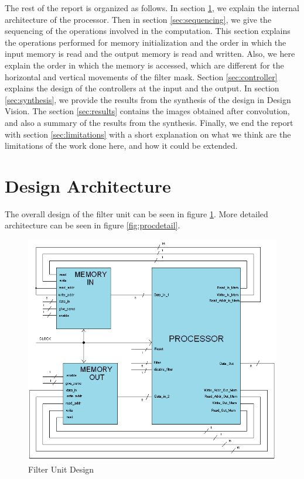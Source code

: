 \documentclass[11pt,a4paper]{article}
\begin{document}
The rest of the report is organized as follows. In section \ref{sec:design}, we explain the internal architecture of the processor. Then in section \ref{sec:sequencing}, we give the sequencing of the operations involved in the computation. This section explains the operations performed for memory initialization and the order in which the input memory is read and the output memory is read and written. Also, we here explain the order in which the memory is accessed, which are different for the horizontal and vertical movements of the filter mask. Section \ref{sec:controller} explains the design of the controllers at the input and the output. In section \ref{sec:synthesis}, we provide the results from the synthesis of the design in Design Vision. The section \ref{sec:results} contains the images obtained after convolution, and also a summary of the results from the synthesis. Finally, we end the report with section \ref{sec:limitations} with a short explanation on what we think are the limitations of the work done here, and how it could be extended.

\section{Design Architecture}
\label{sec:design}
The overall design of the filter unit can be seen in figure \ref{fig:proc}. More detailed architecture can be seen in figure \ref{fig:procdetail}.

\begin{figure}[h]
	\centering
		\includegraphics[width=6in]{./images/processador.PNG}
	\caption{Filter Unit Design}	\label{fig:proc}
\end{figure}
\end{document}
